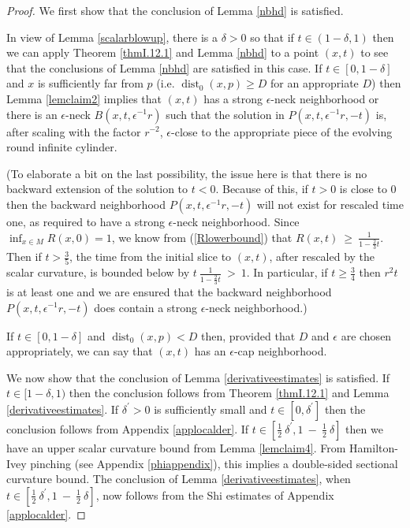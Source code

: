 \documentclass[12pt]{amsart}
\newcommand{\dist}{\operatorname{dist}}
\numberwithin{equation}{section}
\theoremstyle{plain}
\theoremstyle{definition}
\theoremstyle{remark}
\begin{document}
\begin{proof}
We first show that the conclusion of Lemma \ref{nbhd} is satisfied.

In view of Lemma \ref{scalarblowup}, there is a $\delta > 0$ so that
if $t \in (1-\delta, 1)$ then
we can apply Theorem \ref{thmI.12.1}
and Lemma \ref{nbhd} to a point $(x,t)$ to see that the conclusions
of Lemma \ref{nbhd} are satisfied in this case.
If $t \in [0, 1-\delta]$ and $x$ is sufficiently far from $p$ 
(i.e. $\dist_0(x,p) \ge D$ for an appropriate $D$) then Lemma \ref{lemclaim2} implies 
that $(x,t)$ has a strong $\epsilon$-neck neighborhood or
there is an $\epsilon$-neck $B(x,t,\epsilon^{-1} r)$
such that the solution in $P(x,t,\epsilon^{-1}r, -t)$ is, after
scaling with the factor $r^{-2}$, $\epsilon$-close to the appropriate
piece of the evolving round infinite cylinder. 

(To elaborate a bit on the last possibility, 
the issue here is that
there is no backward extension of the solution to $t<0$.
Because of this, if $t >0$ is close to $0$ then the backward
neighborhood 
$P(x,t,\epsilon^{-1}r, -t)$ will not exist for rescaled time one,
as required to have a strong $\epsilon$-neck neighborhood. 
Since $\inf_{x \in M} R(x,0) = 1$, we know from
(\ref{Rlowerbound}) that
$R(x,t) \: \ge \: \frac{1}{1- \frac23 t}$.
Then if $t > \frac35$, the time from the initial 
slice to $(x,t)$, after rescaled by the scalar curvature, is bounded below by
$t \: \frac{1}{1- \frac23 t} \: > \: 1$. In particular,
if $t \ge \frac34$ then $r^2 t$ is at least one and
we are ensured that
the backward neighborhood 
$P(x,t,\epsilon^{-1}r, -t)$ does contain a strong
$\epsilon$-neck neighborhood.)

If $t \in [0, 1-\delta]$ and 
$\dist_0(x,p) < D$ then,  provided that
$D$ and $\epsilon$ are chosen appropriately, we can say that
$(x,t)$ has an $\epsilon$-cap neighborhood.

We now show that the conclusion of 
Lemma \ref{derivativeestimates} is satisfied.
If $t \in [1-\delta, 1)$ then the conclusion follows from 
Theorem \ref{thmI.12.1} and Lemma \ref{derivativeestimates}.
If $\delta^\prime > 0$ is sufficiently
small and $t \in [0, \delta^\prime]$ then the conclusion follows from Appendix
\ref{applocalder}. If $t \in [\frac12 \: \delta^\prime, 
1 \: - \: \frac12 \: \delta]$
then we have an upper scalar curvature bound from Lemma \ref{lemclaim4}.
From Hamilton-Ivey pinching (see Appendix \ref{phiappendix}), this implies
a double-sided sectional curvature bound.  
The conclusion of Lemma \ref{derivativeestimates},
when $t \in [\frac12 \: \delta^\prime, 
1 \: - \: \frac12 \: \delta]$, now follows from
the Shi estimates of Appendix \ref{applocalder}. 


\end{proof}
\end{document}
